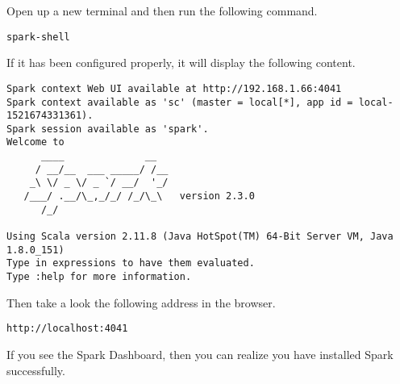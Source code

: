 Open up a new terminal and then run the following command.

\begin{lstlisting}
spark-shell
\end{lstlisting}

If it has been configured properly, it will display the following content.

\begin{lstlisting}
Spark context Web UI available at http://192.168.1.66:4041
Spark context available as 'sc' (master = local[*], app id = local-1521674331361).
Spark session available as 'spark'.
Welcome to
      ____              __
     / __/__  ___ _____/ /__
    _\ \/ _ \/ _ `/ __/  '_/
   /___/ .__/\_,_/_/ /_/\_\   version 2.3.0
      /_/
         
Using Scala version 2.11.8 (Java HotSpot(TM) 64-Bit Server VM, Java 1.8.0_151)
Type in expressions to have them evaluated.
Type :help for more information.
\end{lstlisting}

Then take a look the following address in the browser.
\begin{lstlisting}
http://localhost:4041
\end{lstlisting}

If you see the Spark Dashboard, then you can realize you have installed Spark
successfully. 